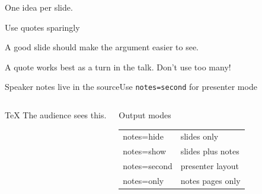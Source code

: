 \documentclass[aspectratio=169]{beamer}
\begin{document}
\begin{frame}
  One idea per slide.
\end{frame}

\begin{frame}{Use quotes sparingly}
  \begin{cookiequote}
    A good slide should make the argument easier to see.
  \end{cookiequote}

  \vspace{.4em}
  A quote works best as a turn in the talk. Don't use too many!
\end{frame}

\begin{frame}[fragile]{Speaker notes live in the source}{Use \texttt{notes=second} for presenter mode}
  \begin{columns}[T,onlytextwidth]
      \begin{cookiecode}[title=Inside any frame]{TeX}
The audience sees this.

      \end{cookiecode}

      \begin{block}{Output modes}
        \small
        \begin{tabularx}{\linewidth}{@{}>{\ttfamily}lX@{}}
          notes=hide & slides only \\
          notes=show & slides plus notes \\
          notes=second & presenter layout \\
          notes=only & notes pages only
        \end{tabularx}
      \end{block}

       \hspace{.25em}
  \end{columns}

\end{frame}
\end{document}
